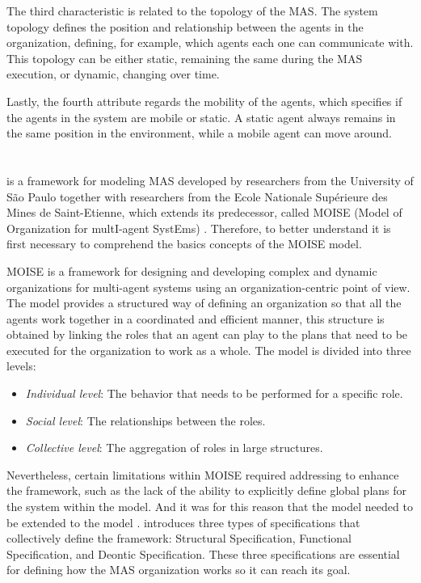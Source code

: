 The third characteristic is related to the topology of the MAS. The system topology defines the position and relationship between the agents in the organization, defining, for example, which agents each one can communicate with. This topology can be either static, remaining the same during the MAS execution, or dynamic, changing over time.

Lastly, the fourth attribute regards the mobility of the agents, which specifies if the agents in the system are mobile or static. A static agent always remains in the same position in the environment, while a mobile agent can move around.

\section{\MOISEpBf}

\MOISEp \cite{MOISEp} is a framework for modeling MAS developed by researchers from the University of São Paulo together with researchers from the Ecole Nationale Supérieure des Mines de Saint-Etienne, which extends its predecessor, called MOISE (Model of Organization for multI-agent SystEms) \cite{Moise}. Therefore, to better understand \MOISEp it is first necessary to comprehend the basics concepts of the MOISE model.

MOISE is a framework for designing and developing complex and dynamic organizations for multi-agent systems using an organization-centric point of view. The model provides a structured way of defining an organization so that all the agents work together in a coordinated and efficient manner, this structure is obtained by linking the roles that an agent can play to the plans that need to be executed for the organization to work as a whole. The model is divided into three levels:

\begin{itemize}
    \item \textit{Individual level}: The behavior that needs to be performed for a specific role.
    \item \textit{Social level}: The relationships between the roles.
    \item \textit{Collective level}: The aggregation of roles in large structures.
\end{itemize}

Nevertheless, certain limitations within MOISE required addressing to enhance the framework, such as the lack of the ability to explicitly define global plans for the system within the model. And it was for this reason that the model needed to be extended to the \MOISEp model \cite{MOISEp}. \MOISEp introduces three types of specifications that collectively define the framework: Structural Specification, Functional Specification, and Deontic Specification. These three specifications are essential for defining how the MAS organization works so it can reach its goal.

